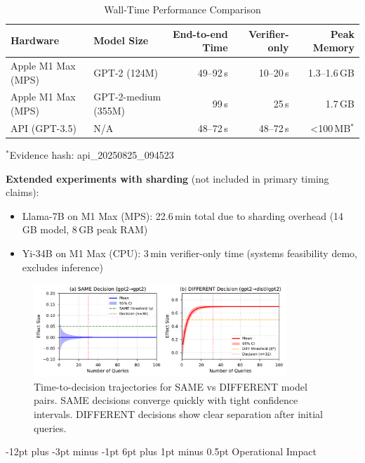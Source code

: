 \documentclass[11pt]{article}
\makeatletter
\renewcommand\subsection{\@startsection{subsection}{2}{\z@}%
  {-12pt plus -3pt minus -1pt}%
  {6pt plus 1pt minus 0.5pt}%
  {\normalfont\large\bfseries}}
\makeatother
\begin{document}
\begin{table}[ht!]
\centering
\caption{Wall-Time Performance Comparison}
\label{tab:wall-time}
\small
\begin{tabular}{l l r r r}
\toprule
\textbf{Hardware} & \textbf{Model Size} & \textbf{End-to-end Time} & \textbf{Verifier-only} & \textbf{Peak Memory} \\
\midrule
Apple M1 Max (MPS) & GPT-2 (124M) & 49--92\,s & 10--20\,s & 1.3--1.6\,GB \\
Apple M1 Max (MPS) & GPT-2-medium (355M) & 99\,s & 25\,s & 1.7\,GB \\
API (GPT-3.5) & N/A & 48--72\,s & 48--72\,s & <100\,MB$^*$ \\
\bottomrule
\end{tabular}

\vspace{3pt}
\footnotesize{$^*$Evidence hash: api\_20250825\_094523}
\end{table}

\textbf{Extended experiments with sharding} (not included in primary timing claims):
\begin{itemize}
\item Llama-7B on M1 Max (MPS): 22.6\,min total due to sharding overhead (14\,GB model, 8\,GB peak RAM)
\item Yi-34B on M1 Max (CPU): 3\,min verifier-only time (systems feasibility demo, excludes inference)
\end{itemize}

\begin{figure}[ht!]
\centering
\includegraphics[width=0.85\textwidth]{figures/fig1_time_to_decision.pdf}
\caption{Time-to-decision trajectories for SAME vs DIFFERENT model pairs. SAME decisions converge quickly with tight confidence intervals. DIFFERENT decisions show clear separation after initial queries.}
\label{fig:time-to-decision}
\end{figure}

\subsection{Operational Impact}
\end{document}
